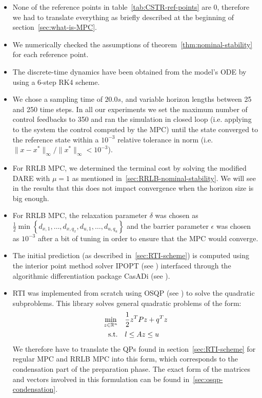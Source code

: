 \documentclass[12pt]{article}
\begin{document}
\begin{itemize}[label=\textbullet]
	\item None of the reference points in table~\ref{tab:CSTR-ref-points} are 0, therefore we had to translate everything as briefly described at the beginning of section~\ref{sec:what-is-MPC}.

	\item We numerically checked the assumptions of theorem~\ref{thm:nominal-stability} for each reference point.

	\item The discrete-time dynamics have been obtained from the model's ODE by using a 6-step RK4 scheme.

	\item We chose a sampling time of $20.0s$, and variable horizon lengths between 25 and 250 time steps.
	In all our experiments we set the maximum number of control feedbacks to 350 and ran the simulation in closed loop (i.e. applying to the system the control computed by the MPC) until the state converged to the reference state within a $10^{-3}$ relative tolerance in norm (i.e. $\|x-x^*\|_\infty/\|x^*\|_\infty<10^{-3}$).

	\item For RRLB MPC, we determined the terminal cost by solving the modified DARE with $\mu=1$ as mentioned in~\ref{sec:RRLB-nominal-stability}.
	We will see in the results that this does not impact convergence when the horizon size is big enough.

	\item For RRLB MPC, the relaxation parameter $\delta$ was chosen as $\frac{1}{2}\min\left\{ d_{x,1},\ldots, d_{x,q_x},d_{u,1},\ldots,d_{u,q_u} \right\}$ and the barrier parameter $\epsilon$ was chosen as $10^{-3}$ after a bit of tuning in order to ensure that the MPC would converge.

	\item The initial prediction (as described in~\ref{sec:RTI-scheme}) is computed using the interior point method solver IPOPT (see \cite{ipopt}) interfaced through the algorithmic differentiation package CasADi (see \cite{casadi}).

	\item RTI was implemented from scratch using OSQP (see \cite{osqp}) to solve the quadratic subproblems.
	This library solves general quadratic problems of the form:
	\begin{align*}
		\underset{z\in\mathbb{R}^n}{\min}&\quad\frac{1}{2}z^TPz+q^Tz\\
		\text{s.t.}&\quad l\leq Az\leq u
	\end{align*}
	We therefore have to translate the QPs found in section~\ref{sec:RTI-scheme} for regular MPC and RRLB MPC into this form, which corresponds to the condensation part of the preparation phase.
	The exact form of the matrices and vectors involved in this formulation can be found in~\ref{sec:osqp-condensation}.


\end{itemize}
\end{document}
